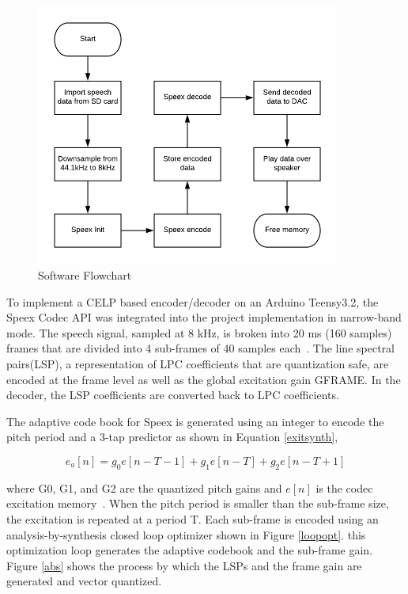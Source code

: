 \documentclass[letterpaper]{article}
\begin{document}
\begin{figure}[h!]
    \centering
    \includegraphics[width=10cm]{soft}
    \caption{Software Flowchart}
    \label{Software}
\end{figure}

To implement a CELP based encoder/decoder on an Arduino Teensy3.2, the Speex Codec API was integrated into the project implementation in narrow-band mode. The speech signal, sampled at 8 kHz, is broken into 20 ms (160 samples) frames that are divided into 4 sub-frames of 40 samples each~\cite{valin2007speex}. The line spectral pairs(LSP), a representation of LPC coefficients that are quantization safe, are encoded at the frame level as well as the global excitation gain GFRAME. In the decoder, the LSP coefficients are converted back to LPC coefficients. 

The adaptive code book for Speex is generated using an integer to encode the pitch period and a 3-tap predictor as shown in Equation \ref{exitsynth}, 

\begin{equation}\label{exitsynth}
    e_a[n] = g_0e[n-T-1] + g_1e[n-T] + g_2e[n-T+1] 
\end{equation}

where G0, G1, and G2 are the quantized pitch gains and $e[n]$ is the codec excitation memory~\cite{valin2007speex}. When the pitch period is smaller than the sub-frame size, the excitation is repeated at a period T. Each sub-frame is encoded using an analysis-by-synthesis closed loop optimizer shown in Figure \ref{loopopt}. this optimization loop generates the adaptive codebook and the sub-frame gain. Figure \ref{abs} shows the process by which the LSPs and the frame gain are generated and vector quantized.
\end{document}
